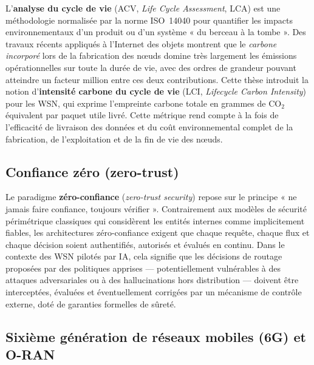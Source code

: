 L'\textbf{analyse du cycle de vie} (ACV, \emph{Life Cycle Assessment}, LCA) est une méthodologie normalisée par la norme ISO~14040 pour quantifier les impacts environnementaux d'un produit ou d'un système « du berceau à la tombe »\cite{iso14040}. Des travaux récents appliqués à l'Internet des objets montrent que le \emph{carbone incorporé} lors de la fabrication des nœuds domine très largement les émissions opérationnelles sur toute la durée de vie, avec des ordres de grandeur pouvant atteindre un facteur million entre ces deux contributions\cite{pirson2021embodied,bashir2024sunk,mersy2025lca_data}. Cette thèse introduit la notion d'\textbf{intensité carbone du cycle de vie} (LCI, \emph{Lifecycle Carbon Intensity}) pour les WSN, qui exprime l'empreinte carbone totale en grammes de CO$_2$ équivalent par paquet utile livré. Cette métrique rend compte à la fois de l'efficacité de livraison des données et du coût environnemental complet de la fabrication, de l'exploitation et de la fin de vie des nœuds\cite{pirson2021embodied,aioti2024carbon}.

\subsection*{Confiance zéro (zero-trust)}

Le paradigme \textbf{zéro-confiance} (\emph{zero-trust security}) repose sur le principe « ne jamais faire confiance, toujours vérifier »\cite{rose2020nist}. Contrairement aux modèles de sécurité périmétrique classiques qui considèrent les entités internes comme implicitement fiables, les architectures zéro-confiance exigent que chaque requête, chaque flux et chaque décision soient authentifiés, autorisés et évalués en continu\cite{Kizza2013,ztaiot_acm2025}. Dans le contexte des WSN pilotés par IA, cela signifie que les décisions de routage proposées par des politiques apprises — potentiellement vulnérables à des attaques adversariales ou à des hallucinations hors distribution — doivent être interceptées, évaluées et éventuellement corrigées par un mécanisme de contrôle externe, doté de garanties formelles de sûreté\cite{amodei2016concrete,Huang2017AdvRL,subplay_marl2025}.

\subsection*{Sixième génération de réseaux mobiles (6G) et O-RAN}

